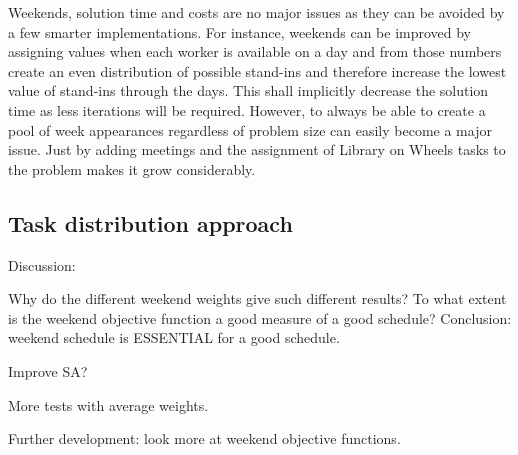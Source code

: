  Weekends, solution time and costs are no major issues as they can be avoided by a few smarter implementations. For instance, weekends can be improved by assigning values when each worker is available on a day and from those numbers create an even distribution of possible stand-ins and therefore increase the lowest value of stand-ins through the days. This shall implicitly decrease the solution time as less iterations will be required. However, to always be able to create a pool of week appearances regardless of problem size can easily become a major issue. Just by adding meetings and the assignment of Library on Wheels tasks to the problem makes it grow considerably.
 

\subsection{Task distribution approach}
Discussion: 

Why do the different weekend weights give such different results?
To what extent is the weekend objective function a good measure of a good schedule?
Conclusion: weekend schedule is ESSENTIAL for a good schedule.

Improve SA?

More tests with average weights.

Further development: look more at weekend objective functions.
